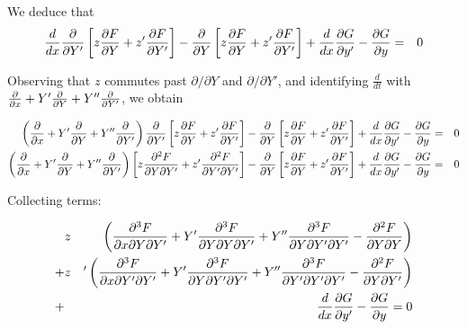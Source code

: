 \documentclass[pdflatex,sn-mathphys-num]{sn-jnl}%
\theoremstyle{thmstyleone}%
\theoremstyle{thmstyletwo}%
\theoremstyle{thmstylethree}%
\begin{document}
We deduce that
\begin{eqnarray}
\frac{d}{dx}\di{}{Y'}\left[z\di{F}{Y} + z'\di{F}{Y'}\right]
  - \di{}{Y}\left[z\di{F}{Y} + z'\di{F}{Y'}\right] +  \el{G} &=&0\nonumber\\
\end{eqnarray}

Observing that $z$ commutes past $\partial/\partial Y$ and
$\partial/\partial Y'$, and identifying $\frac{d}{dt}$ with
$\di{}{x}+ Y'\di{}{Y} + Y''\di{}{Y'}$, we obtain

\begin{eqnarray}
  \left(\di{}{x}+ Y'\di{}{Y} + Y''\di{}{Y'}\right)
  \di{}{Y'}\left[z\di{F}{Y} + z'\di{F}{Y'}\right]
  - \di{}{Y}\left[z\di{F}{Y} + z'\di{F}{Y'}\right] +  \el{G} &=&0\nonumber\\
  \left(\di{}{x}+ Y'\di{}{Y} + Y''\di{}{Y'}\right)
  \left[z\dii{F}{Y}{Y'} + z'\dii{F}{Y'}{Y'}\right]
  - \di{}{Y}\left[z\di{F}{Y} + z'\di{F}{Y'}\right] +  \el{G} &=&0
\end{eqnarray}

Collecting terms:

\begin{eqnarray}
  &z& \left(\diii{F}{x}{Y }{Y'} + Y'\diii{F}{Y}{Y }{Y'} + Y''\diii{F}{Y }{Y'}{Y'} - \dii{F}{Y}{Y }\right)\nonumber\\
 +&z&'\left(\diii{F}{x}{Y'}{Y'} + Y'\diii{F}{Y}{Y'}{Y'} + Y''\diii{F}{Y'}{Y'}{Y'} - \dii{F}{Y}{Y'}\right)\nonumber\\
  +&{}&  \el{G} = 0
\end{eqnarray}


\end{document}
